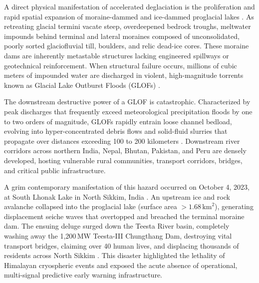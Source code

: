 \documentclass{mnnit}
\begin{document}
A direct physical manifestation of accelerated deglaciation is the proliferation and rapid spatial expansion of moraine-dammed and ice-dammed proglacial lakes \cite{carrivick2016glof, richardson2000overview}. As retreating glacial termini vacate steep, overdeepened bedrock troughs, meltwater impounds behind terminal and lateral moraines composed of unconsolidated, poorly sorted glaciofluvial till, boulders, and relic dead-ice cores. These moraine dams are inherently metastable structures lacking engineered spillways or geotechnical reinforcement. When structural failure occurs, millions of cubic meters of impounded water are discharged in violent, high-magnitude torrents known as Glacial Lake Outburst Floods (GLOFs) \cite{cook2018glof, cui2014mechanism}.

The downstream destructive power of a GLOF is catastrophic. Characterized by peak discharges that frequently exceed meteorological precipitation floods by one to two orders of magnitude, GLOFs rapidly entrain loose channel bedload, evolving into hyper-concentrated debris flows and solid-fluid slurries that propagate over distances exceeding 100 to 200 kilometers \cite{sattar2021numerical, mergili2020ravaflow}. Downstream river corridors across northern India, Nepal, Bhutan, Pakistan, and Peru are densely developed, hosting vulnerable rural communities, transport corridors, bridges, and critical public infrastructure. 

A grim contemporary manifestation of this hazard occurred on October 4, 2023, at South Lhonak Lake in North Sikkim, India \cite{babu2024southlhonak}. An upstream ice and rock avalanche collapsed into the proglacial lake (surface area $> 1.68\,\text{km}^2$), generating displacement seiche waves that overtopped and breached the terminal moraine dam. The ensuing deluge surged down the Teesta River basin, completely washing away the 1,200\,MW Teesta-III Chungthang Dam, destroying vital transport bridges, claiming over 40 human lives, and displacing thousands of residents across North Sikkim \cite{babu2024southlhonak, shrestha2023cascading}. This disaster highlighted the lethality of Himalayan cryospheric events and exposed the acute absence of operational, multi-signal predictive early warning infrastructure.
\end{document}
